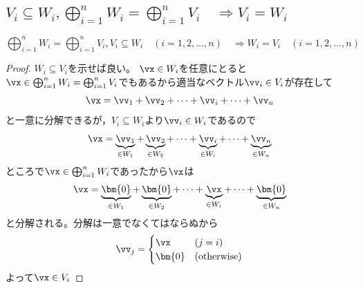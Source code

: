         \subsection{\texorpdfstring{$V_i \subseteq W_i,\bigoplus_{i=1}^n {W_i} = \bigoplus_{i=1}^n {V_i}\quad\Rightarrow V_i=W_i$}{Vi⊆Wi, V1⊕...⊕Vn = W1⊕...⊕Wn ⇒ Vi=Wi}}
            \begin{shadebox}
                \[\bigoplus_{i=1}^n{W_i}=\bigoplus_{i=1}^n{V_i},V_i \subseteq W_i\quad(i=1,2,\dotsc,n)\quad\Rightarrow W_i=V_i\quad(i=1,2,\dotsc,n)\]
            \end{shadebox}
            \begin{proof}
                $W_i\subseteq V_i$を示せば良い。
                $\vx\in W_i$を任意にとると$\vx\in \bigoplus_{i=1}^n{W_i}=\bigoplus_{i=1}^n{V_i}$でもあるから適当なベクトル$\vv_i\in V_i$が存在して
                \[\vx = \vv_1+\vv_2+\dotsb+\vv_i+\dotsb+\vv_n\]
                と一意に分解できるが，$V_i\subseteq W_i$より$\vv_i\in W_i$であるので
                \[\vx = \underbrace{\vv_1}_{\in W_1}+\underbrace{\vv_2}_{\in W_2}+\dotsb+\underbrace{\vv_i}_{\in W_i}+\dotsb+\underbrace{\vv_n}_{\in W_n}\]
                ところで$\vx\in \bigoplus_{i=1}^n{W_i}$であったから$\vx$は
                \[\vx = \underbrace{\bm{0}}_{\in W_1}+\underbrace{\bm{0}}_{\in W_2}+\dotsb+\underbrace{\vx}_{\in W_i}+\dotsb+\underbrace{\bm{0}}_{\in W_n}\]
                と分解される。分解は一意でなくてはならぬから
                \begin{equation*}
                    \vv_j =
                    \begin{cases}
                        \vx & (j=i)\\
                        \bm{0} & (\mathrm{otherwise})
                    \end{cases}
                \end{equation*}
                よって$\vx\in V_i$
            \end{proof}
